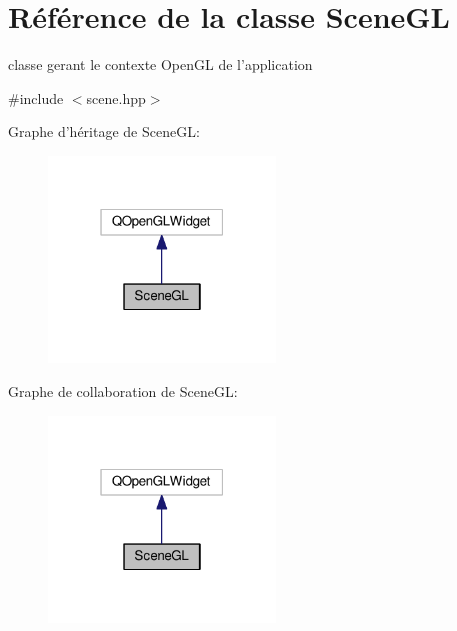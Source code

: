 \hypertarget{classSceneGL}{\section{Référence de la classe Scene\+G\+L}
\label{classSceneGL}
}


classe gerant le contexte Open\+G\+L de l'application  




{\ttfamily \#include $<$scene.\+hpp$>$}



Graphe d'héritage de Scene\+G\+L\+:\nopagebreak
\begin{figure}[H]
\begin{center}
\leavevmode
\includegraphics[width=171pt]{classSceneGL__inherit__graph}
\end{center}
\end{figure}


Graphe de collaboration de Scene\+G\+L\+:\nopagebreak
\begin{figure}[H]
\begin{center}
\leavevmode
\includegraphics[width=171pt]{classSceneGL__coll__graph}
\end{center}
\end{figure}
